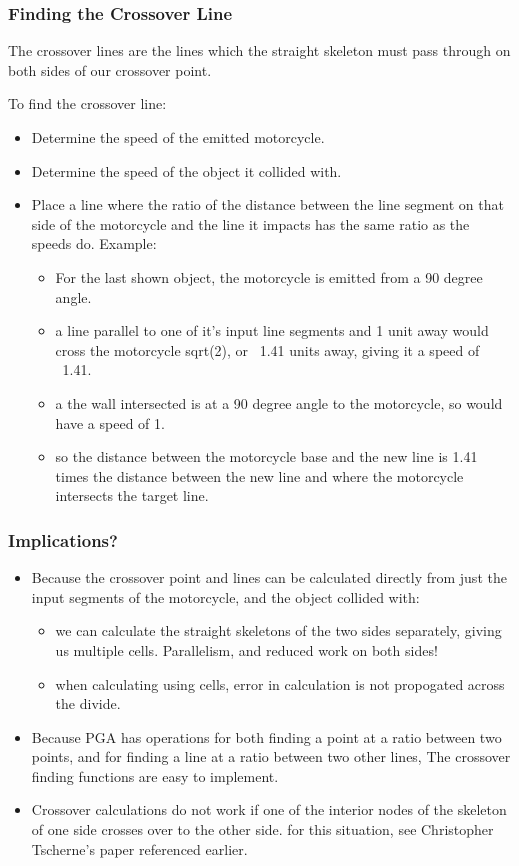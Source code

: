 \documentclass[hyperref={pdfpagemode=FullScreen},aspectratio=169]{beamer}
\begin{document}
\begin{frame}
  \frametitle{Finding the Crossover Line}
  The crossover lines are the lines which the straight skeleton must pass through on both sides of our crossover point.\par
  To find the crossover line:
  \begin{itemize}
  \item Determine the speed of the emitted motorcycle.
  \item Determine the speed of the object it collided with.
  \item Place a line where the ratio of the distance between the line segment on that side of the motorcycle and the line it impacts has the same ratio as the speeds do.
  Example:
    \begin{itemize}
    \item For the last shown object, the motorcycle is emitted from a 90 degree angle.
    \item a line parallel to one of it's input line segments and 1 unit away would cross the motorcycle sqrt(2), or ~1.41 units away, giving it a speed of ~1.41.
    \item a the wall intersected is at a 90 degree angle to the motorcycle, so would have a speed of 1.
    \item so the distance between the motorcycle base and the new line is 1.41 times the distance between the new line and where the motorcycle intersects the target line.
    \end{itemize}
  \end{itemize}
\end{frame}

\begin{frame}
  \frametitle{Implications?}
  \begin{itemize}
  \item Because the crossover point and lines can be calculated directly from just the input segments of the motorcycle, and the object collided with:
    \begin {itemize}
    \item we can calculate the straight skeletons of the two sides separately, giving us multiple cells. Parallelism, and reduced work on both sides!
    \item when calculating using cells, error in calculation is not propogated across the divide.
    \end {itemize}
  \item Because PGA has operations for both finding a point at a ratio between two points, and for finding a line at a ratio between two other lines, The crossover finding functions are easy to implement.
  \item Crossover calculations do not work if one of the interior nodes of the skeleton of one side crosses over to the other side. for this situation, see Christopher Tscherne's paper referenced earlier.
  \end {itemize}
\end{frame}
\end{document}
